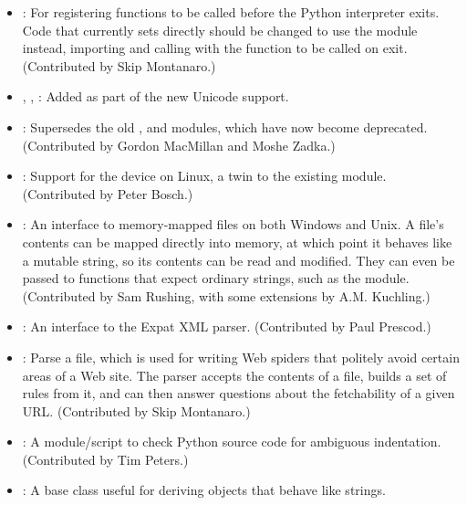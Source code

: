 \documentclass{howto}
\begin{document}
\begin{itemize}

\item{}: 
For registering functions to be called before the Python interpreter exits.
Code that currently sets
 directly should be changed to 
use the  module instead, importing 
and calling  with 
the function to be called on exit.
(Contributed by Skip Montanaro.)

\item{, , :}  Added as part of the new Unicode support. 

\item{:} Supersedes the old ,  and
 modules, which have now become deprecated.
(Contributed by Gordon MacMillan and Moshe Zadka.)

\item{:} Support for the 
device on Linux, a twin to the existing  module.
(Contributed by Peter Bosch.)

\item{:} An interface to memory-mapped files on both
Windows and Unix.  A file's contents can be mapped directly into
memory, at which point it behaves like a mutable string, so its
contents can be read and modified.  They can even be passed to
functions that expect ordinary strings, such as the 
module. (Contributed by Sam Rushing, with some extensions by
A.M. Kuchling.)

\item{:} An interface to the Expat XML parser.
(Contributed by Paul Prescod.)

\item{:} Parse a  file, which is
used for writing Web spiders that politely avoid certain areas of a
Web site.  The parser accepts the contents of a  file,
builds a set of rules from it, and can then answer questions about
the fetchability of a given URL.  (Contributed by Skip Montanaro.)

\item{:} A module/script to 
check Python source code for ambiguous indentation.
(Contributed by Tim Peters.)

\item{:} A base class useful for deriving objects that behave like strings.  


\end{itemize}
\end{document}
